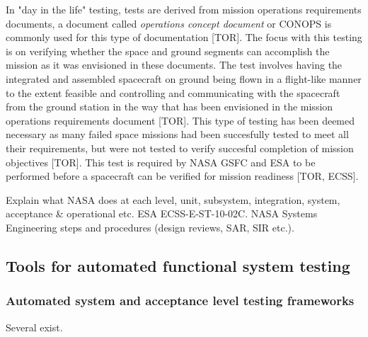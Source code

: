 \documentclass[english,12pt,a4paper,pdftex,elec,utf8]{aaltothesis}
\begin{document}
In "day in the life" testing, tests are derived from mission operations requirements documents, a document called \textit{operations concept document} or CONOPS is commonly used for this type of documentation [TOR]. The focus with this testing is on verifying whether the space and ground segments can accomplish the mission as it was envisioned in these documents. The test involves having the integrated and assembled spacecraft on ground being flown in a flight-like manner to the extent feasible and controlling and communicating with the spacecraft from the ground station in the way that has been envisioned in the mission operations requirements document [TOR]. This type of testing has been deemed necessary as many failed space missions had been succesfully tested to meet all their requirements, but were not tested to verify succesful completion of mission objectives [TOR]. This test is required by NASA GSFC and ESA to be performed before a spacecraft can be verified for mission readiness [TOR, ECSS]. \par 
Explain what NASA does at each level, unit, subsystem, integration, system, acceptance \& operational etc.
ESA ECSS-E-ST-10-02C.
NASA Systems Engineering steps and procedures (design reviews, SAR, SIR etc.).\par
\subsection{Tools for automated functional system testing}
\subsubsection{Automated system and acceptance level testing frameworks}
Several exist.\par 
\end{document}
